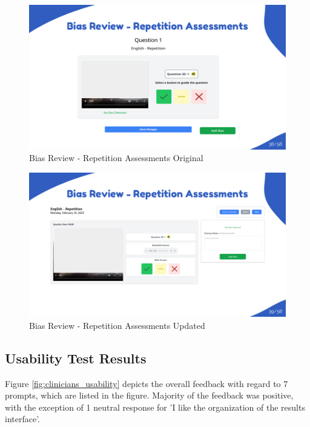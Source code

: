 \documentclass{article}
\begin{document}
\begin{figure}[H]
  \centering
  \includegraphics[width=\textwidth]{images/slide38.png}
  \caption{Bias Review - Repetition Assessments Original}
  \label{fig:rep_old}
\end{figure}

\begin{figure}[H]
  \centering
  \includegraphics[width=\textwidth]{images/slide39.png}
  \caption{Bias Review - Repetition Assessments Updated}
  \label{fig:rep_new}
\end{figure}

\newpage

\subsection{Usability Test Results}

\hspace{2em} Figure \ref{fig:clinicians_usability} depicts the overall feedback with regard to 7 prompts, which are listed in the figure.
Majority of the feedback was positive, with the exception of 1 neutral response for 'I like the organization of the results interface'.
\end{document}
